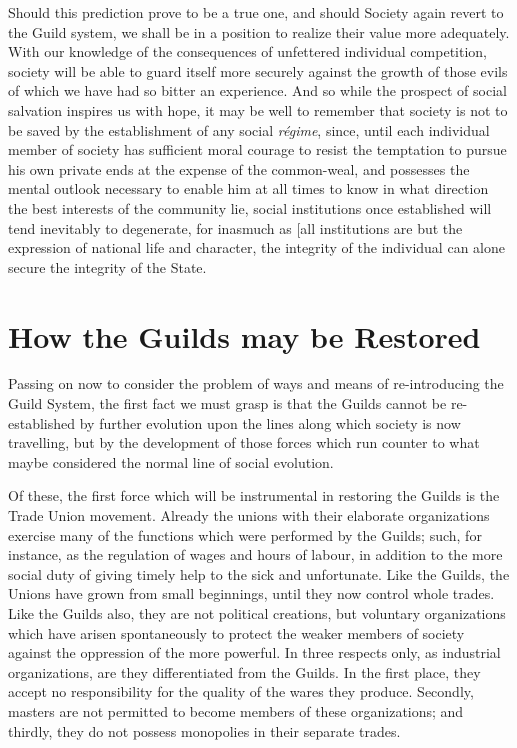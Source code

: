 \documentclass{book}
\begin{document}
Should this prediction prove to be a true one, and should Society again revert to the Guild system, we shall be in a position to realize their value more adequately. With our knowledge of the consequences of unfettered individual competition, society will be able to guard itself more securely against the growth of those evils of which we have had so bitter an experience. And so while the prospect of social salvation inspires us with hope, it may be well to remember that society is not to be saved by the establishment of any social \emph{régime}, since, until each individual member of society has sufficient moral courage to resist the temptation to pursue his own private ends at the expense of the common-weal, and possesses the mental outlook necessary to enable him at all times to know in what direction the best interests of the community lie, social institutions once established will tend inevitably to degenerate, for inasmuch as {[}all institutions are but the expression of national life and character, the integrity of the individual can alone secure the integrity of the State.

\chapter{How the Guilds may be Restored}
\label{chapter-5}
Passing on now to consider the problem of ways and means of re-introducing the Guild System, the first fact we must grasp is that the Guilds cannot be re-established by further evolution upon the lines along which society is now travelling, but by the development of those forces which run counter to what maybe considered the normal line of social evolution.

Of these, the first force which will be instrumental in restoring the Guilds is the Trade Union movement. Already the unions with their elaborate organizations exercise many of the functions which were performed by the Guilds; such, for instance, as the regulation of wages and hours of labour, in addition to the more social duty of giving timely help to the sick and unfortunate. Like the Guilds, the Unions have grown from small beginnings, until they now control whole trades. Like the Guilds also, they are not political creations, but voluntary organizations which have arisen spontaneously to protect the weaker members of society against the oppression of the more powerful. In three respects only, as industrial organizations, are they differentiated from the Guilds. In the first place, they accept no responsibility for the quality of the wares they produce. Secondly, masters are not permitted to become members of these organizations; and thirdly, they do not possess monopolies in their separate trades.
\end{document}
